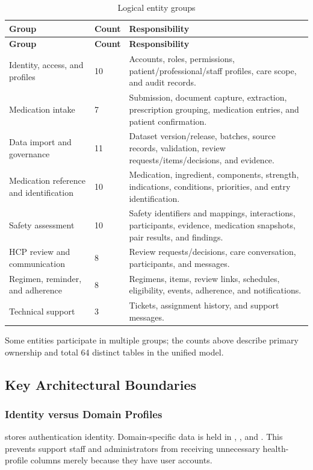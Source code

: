 \begin{longtable}{L{4.0cm}L{2.0cm}L{9.2cm}}
\caption{Logical entity groups}\label{tab:entity-groups}\\
\toprule
\textbf{Group} & \textbf{Count} & \textbf{Responsibility}\\
\midrule
\endfirsthead
\toprule
\textbf{Group} & \textbf{Count} & \textbf{Responsibility}\\
\midrule
\endhead
Identity, access, and profiles & 10 & Accounts, roles, permissions, patient/professional/staff profiles, care scope, and audit records.\\
Medication intake & 7 & Submission, document capture, extraction, prescription grouping, medication entries, and patient confirmation.\\
Data import and governance & 11 & Dataset version/release, batches, source records, validation, review requests/items/decisions, and evidence.\\
Medication reference and identification & 10 & Medication, ingredient, components, strength, indications, conditions, priorities, and entry identification.\\
Safety assessment & 10 & Safety identifiers and mappings, interactions, participants, evidence, medication snapshots, pair results, and findings.\\
HCP review and communication & 8 & Review requests/decisions, care conversation, participants, and messages.\\
Regimen, reminder, and adherence & 8 & Regimens, items, review links, schedules, eligibility, events, adherence, and notifications.\\
Technical support & 3 & Tickets, assignment history, and support messages.\\
\bottomrule
\end{longtable}

Some entities participate in multiple groups; the counts above describe primary ownership and total 64 distinct tables in the unified model.

\subsection{Key Architectural Boundaries}

\subsubsection{Identity versus Domain Profiles}

 stores authentication identity. Domain-specific data is held in , , and . This prevents support staff and administrators from receiving unnecessary health-profile columns merely because they have user accounts.

